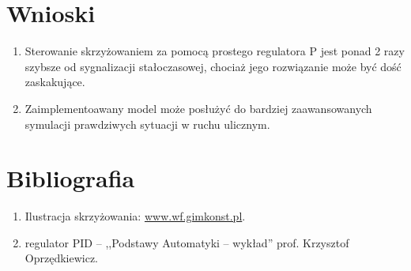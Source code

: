 \documentclass[11pt]{aghdpl}
\begin{document}
\section{Wnioski}
\begin{enumerate}
	\item Sterowanie skrzyżowaniem za pomocą prostego regulatora P jest ponad 2 razy szybsze od sygnalizacji stałoczasowej, chociaż jego rozwiązanie może być dość zaskakujące.
	\item Zaimplementoawany model może posłużyć do bardziej  zaawansowanych symulacji prawdziwych sytuacji w ruchu ulicznym.
\end{enumerate}

\section{Bibliografia}
\begin{enumerate}
\item Ilustracja skrzyżowania: \href{http://www.wf.gimkonst.pl/viewpage.php?page_id=50}{ www.wf.gimkonst.pl}.
\item regulator PID -- ,,Podstawy Automatyki -- wykład'' prof. Krzysztof Oprzędkiewicz.

\end{enumerate}
\end{document}
